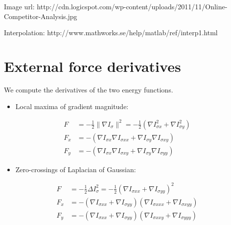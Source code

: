 \documentclass[11pt,a4paper]{article}
\title{}
\author{Malte Stær Nissen}
\begin{document}
\maketitle

Image url: http://cdn.logicspot.com/wp-content/uploads/2011/11/Online-Competitor-Analysis.jpg

Interpolation: http://www.mathworks.se/help/matlab/ref/interp1.html

\section{External force derivatives}
%
We compute the derivatives of the two energy functions.
\begin{itemize}
\item Local maxima of gradient magnitude:
\end{itemize}
%
\begin{align}
F &= - \frac12 \| \nabla I_{\sigma} \|^2 = - \frac12 (\nabla I_{\sigma x}^2 + \nabla I_{\sigma y}^2) \\
F_x &= - (\nabla I_{\sigma x} \nabla I_{\sigma xx} + \nabla I_{\sigma y} \nabla I_{\sigma xy}) \\
F_y &= - (\nabla I_{\sigma x} \nabla I_{\sigma xy} + \nabla I_{\sigma y} \nabla I_{\sigma yy})
\end{align}
%
\begin{itemize}
\item Zero-crossings of Laplacian of Gaussian:
\end{itemize}
%
\begin{align}
F &= - \frac12 \Delta I_{\sigma}^2 = - \frac12 (\nabla I_{\sigma xx} + \nabla I_{\sigma yy})^2 \\
F_x &= - (\nabla I_{\sigma xx} + \nabla I_{\sigma yy}) (\nabla I_{\sigma xxx} + \nabla I_{\sigma xyy}) \\
F_y &= - (\nabla I_{\sigma xx} + \nabla I_{\sigma yy}) (\nabla I_{\sigma xxy} + \nabla I_{\sigma yyy})
\end{align}
%
\end{document}
